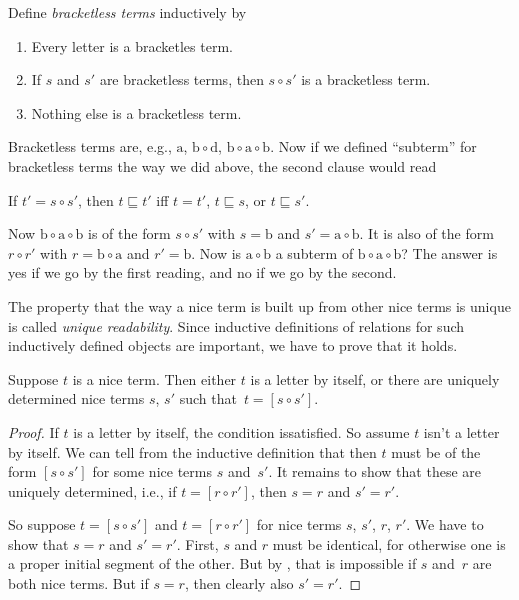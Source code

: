 \documentclass[../../../include/open-logic-section]{subfiles}
\begin{document}
\begin{defn}
  Define \emph{bracketless terms} inductively by
  \begin{enumerate}
  \item Every letter is a bracketles term.
    \item If $s$ and $s'$ are bracketless terms, then $s \circ s'$ is
      a bracketless term.
    \item Nothing else is a bracketless term.
  \end{enumerate}
\end{defn}

Bracketless terms are, e.g., $\mathrm{a}$, $\mathrm{b} \circ
\mathrm{d}$, $\mathrm{b} \circ \mathrm{a} \circ \mathrm{b}$. Now if we
defined ``subterm'' for bracketless terms the way we did above, the
second clause would read
\begin{center}
  If $t' = s \circ s'$, then $t \sqsubseteq t'$ iff $t = t'$, $t
  \sqsubseteq s$, or $t \sqsubseteq s'$.
\end{center}

Now $\mathrm{b} \circ \mathrm{a} \circ \mathrm{b}$ is of the form $s
\circ s'$ with $s = \mathrm{b}$ and $s' = \mathrm{a} \circ
\mathrm{b}$. It is also of the form $r \circ r'$ with $r = \mathrm{b}
\circ \mathrm{a}$ and $r' = \mathrm{b}$.  Now is $\mathrm{a} \circ
\mathrm{b}$ a subterm of $\mathrm{b} \circ \mathrm{a} \circ
\mathrm{b}$?  The answer is yes if we go by the first reading, and no
if we go by the second.

The property that the way a nice term is built up from other nice
terms is unique is called \emph{unique readability}. Since inductive
definitions of relations for such inductively defined objects are
important, we have to prove that it holds.

\begin{prop}
  Suppose $t$ is a nice term. Then either $t$ is a letter by itself,
  or there are uniquely determined nice terms $s$, $s'$ such that~$t =
  [s \circ s']$.
\end{prop}

\begin{proof}
  If $t$ is a letter by itself, the condition issatisfied. So assume
  $t$ isn't a letter by itself. We can tell from the inductive
  definition that then $t$ must be of the form $[s \circ s']$ for some
  nice terms $s$ and~$s'$. It remains to show that these are uniquely
  determined, i.e., if $t = [r \circ r']$, then $s = r$ and $s' = r'$.

  So suppose $t = [s \circ s']$ and $t = [r \circ r']$ for nice terms
  $s$, $s'$, $r$, $r'$. We have to show that $s = r$ and $s' = r'$.
  First, $s$ and $r$ must be identical, for otherwise one is a proper
  initial segment of the other. But by , that
  is impossible if $s$ and~$r$ are both nice terms.  But if $s = r$,
  then clearly also $s' = r'$.
\end{proof}
\end{document}
